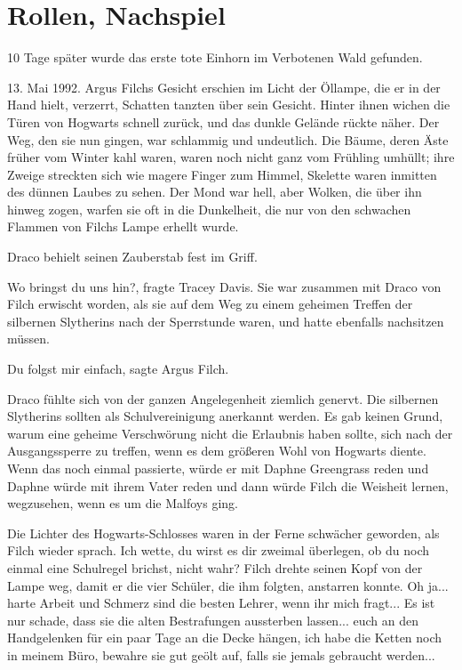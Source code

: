 \chapter{Rollen, Nachspiel}

10 Tage später wurde das erste tote Einhorn im Verbotenen Wald gefunden.

13. Mai 1992. Argus Filchs Gesicht erschien im Licht der Öllampe, die er in der
Hand hielt, verzerrt, Schatten tanzten über sein Gesicht. Hinter ihnen
wichen die Türen von Hogwarts schnell zurück, und das dunkle Gelände
rückte näher. Der Weg, den sie nun gingen, war schlammig und undeutlich.
Die Bäume, deren Äste früher vom Winter kahl waren, waren noch nicht ganz
vom Frühling umhüllt; ihre Zweige streckten sich wie magere Finger zum
Himmel, Skelette waren inmitten des dünnen Laubes zu sehen. Der Mond war
hell, aber Wolken, die über ihn hinweg zogen, warfen sie oft in die
Dunkelheit, die nur von den schwachen Flammen von Filchs Lampe erhellt
wurde.

Draco behielt seinen Zauberstab fest im Griff.

\glqq Wo bringst du uns hin?\grqq{}, fragte Tracey Davis. Sie war zusammen mit
Draco von Filch erwischt worden, als sie auf dem Weg zu einem geheimen
Treffen der silbernen Slytherins nach der Sperrstunde waren, und hatte
ebenfalls nachsitzen müssen.

\glqq Du folgst mir einfach\grqq{}, sagte Argus Filch.

Draco fühlte sich von der ganzen Angelegenheit ziemlich genervt. Die silbernen
Slytherins sollten als Schulvereinigung anerkannt werden. Es gab keinen
Grund, warum eine geheime Verschwörung nicht die Erlaubnis haben sollte,
sich nach der Ausgangssperre zu treffen, wenn es dem größeren Wohl von
Hogwarts diente. Wenn das noch einmal passierte, würde er mit Daphne
Greengrass reden und Daphne würde mit ihrem Vater reden und dann würde
Filch die Weisheit lernen, wegzusehen, wenn es um die Malfoys ging.

Die Lichter des Hogwarts-Schlosses waren in der Ferne schwächer geworden, als
Filch wieder sprach. \glqq Ich wette, du wirst es dir zweimal überlegen,
ob du noch einmal eine Schulregel brichst, nicht wahr?\grqq{} Filch
drehte seinen Kopf von der Lampe weg, damit er die vier Schüler, die ihm
folgten, anstarren konnte. \glqq Oh ja... harte Arbeit und Schmerz sind
die besten Lehrer, wenn ihr mich fragt... Es ist nur schade, dass sie die
alten Bestrafungen aussterben lassen... euch an den Handgelenken für ein
paar Tage an die Decke hängen, ich habe die Ketten noch in meinem Büro,
bewahre sie gut geölt auf, falls sie jemals gebraucht werden...\grqq{}

